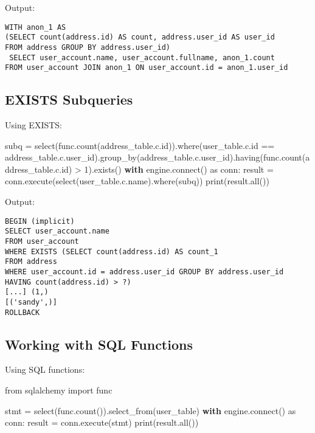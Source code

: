 \documentclass[
  letterpaper,
  DIV=11,
  numbers=noendperiod]{scrreprt}
\newenvironment{Shaded}{\begin{snugshade}}{\end{snugshade}}
\newcommand{\BuiltInTok}[1]{\textcolor[rgb]{0.00,0.23,0.31}{#1}}
\newcommand{\ControlFlowTok}[1]{\textcolor[rgb]{0.00,0.23,0.31}{\textbf{#1}}}
\newcommand{\DecValTok}[1]{\textcolor[rgb]{0.68,0.00,0.00}{#1}}
\newcommand{\ExtensionTok}[1]{\textcolor[rgb]{0.00,0.23,0.31}{#1}}
\newcommand{\ImportTok}[1]{\textcolor[rgb]{0.00,0.46,0.62}{#1}}
\newcommand{\NormalTok}[1]{\textcolor[rgb]{0.00,0.23,0.31}{#1}}
\newcommand{\OperatorTok}[1]{\textcolor[rgb]{0.37,0.37,0.37}{#1}}
\begin{document}
Output:

\begin{verbatim}
WITH anon_1 AS
(SELECT count(address.id) AS count, address.user_id AS user_id
FROM address GROUP BY address.user_id)
 SELECT user_account.name, user_account.fullname, anon_1.count
FROM user_account JOIN anon_1 ON user_account.id = anon_1.user_id
\end{verbatim}

\subsection{EXISTS Subqueries}\label{exists-subqueries}

Using EXISTS:

\begin{Shaded}
\begin{Highlighting}[]
\NormalTok{subq }\OperatorTok{=}\NormalTok{ select(func.count(address\_table.c.}\BuiltInTok{id}\NormalTok{)).where(user\_table.c.}\BuiltInTok{id} \OperatorTok{==}\NormalTok{ address\_table.c.user\_id).group\_by(address\_table.c.user\_id).having(func.count(address\_table.c.}\BuiltInTok{id}\NormalTok{) }\OperatorTok{\textgreater{}} \DecValTok{1}\NormalTok{).exists()}
\ControlFlowTok{with}\NormalTok{ engine.}\ExtensionTok{connect}\NormalTok{() }\ImportTok{as}\NormalTok{ conn:}
\NormalTok{    result }\OperatorTok{=}\NormalTok{ conn.execute(select(user\_table.c.name).where(subq))}
    \BuiltInTok{print}\NormalTok{(result.}\BuiltInTok{all}\NormalTok{())}
\end{Highlighting}
\end{Shaded}

Output:

\begin{verbatim}
BEGIN (implicit)
SELECT user_account.name
FROM user_account
WHERE EXISTS (SELECT count(address.id) AS count_1
FROM address
WHERE user_account.id = address.user_id GROUP BY address.user_id
HAVING count(address.id) > ?)
[...] (1,)
[('sandy',)]
ROLLBACK
\end{verbatim}

\subsection{Working with SQL
Functions}\label{working-with-sql-functions}

Using SQL functions:

\begin{Shaded}
\begin{Highlighting}[]
\ImportTok{from}\NormalTok{ sqlalchemy }\ImportTok{import}\NormalTok{ func}

\NormalTok{stmt }\OperatorTok{=}\NormalTok{ select(func.count()).select\_from(user\_table)}
\ControlFlowTok{with}\NormalTok{ engine.}\ExtensionTok{connect}\NormalTok{() }\ImportTok{as}\NormalTok{ conn:}
\NormalTok{    result }\OperatorTok{=}\NormalTok{ conn.execute(stmt)}
    \BuiltInTok{print}\NormalTok{(result.}\BuiltInTok{all}\NormalTok{())}
\end{Highlighting}
\end{Shaded}
\end{document}
